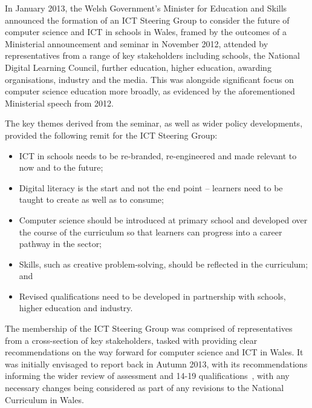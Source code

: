 \documentclass{sig-alternate}
\begin{document}

In January 2013, the Welsh Government's Minister for Education and
Skills announced the formation of an ICT Steering Group to consider
the future of computer science and ICT in schools in Wales, framed by
the outcomes of a Ministerial announcement and seminar in November
2012, attended by representatives from a range of key stakeholders
including schools, the National Digital Learning Council, further
education, higher education, awarding organisations, industry and the
media. This was alongside significant focus on computer science
education more broadly, as evidenced by the aforementioned Ministerial
speech from 2012.

The key themes derived from the seminar, as well as wider policy
developments, provided the following remit for the ICT Steering Group:

\begin{itemize}
\item ICT in schools needs to be re-branded, re-engineered and made
relevant to now and to the future;
\item Digital literacy is the start and not the end point -- learners
need to be taught to create as well as to consume;
\item Computer science should be introduced at primary school and
developed over the course of the curriculum so that learners can
progress into a career pathway in the sector;
\item Skills, such as creative problem-solving, should be reflected in
the curriculum; and
\item Revised qualifications need to be developed in partnership with
schools, higher education and industry.
\end{itemize}


The membership of the ICT Steering Group was comprised of
representatives from a cross-section of key stakeholders, tasked with
providing clear recommendations on the way forward for computer
science and ICT in Wales. It was initially envisaged to report back in
Autumn 2013, with its recommendations informing the wider review of
assessment and 14-19 qualifications~\cite{wgrev14-19:2014}, with any
necessary changes being considered as part of any revisions to the
National Curriculum in Wales.
\end{document}
